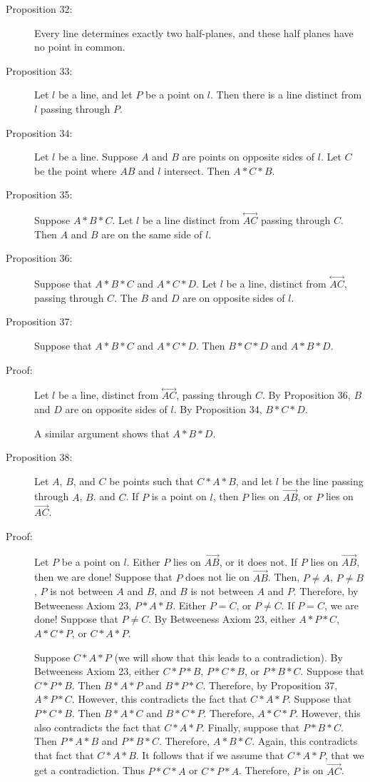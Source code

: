 \documentclass{article}
\newcommand{\linethrough}[1]{\stackrel{\longleftrightarrow}{#1} }
\newcommand{\ray}[1]{\stackrel{\longrightarrow}{#1} }
\begin{document}
\begin{description}

\item[Proposition 32:] Every line determines exactly two half-planes, and these half planes have no point in common.

\item[Proposition 33:] Let $l$ be a line, and let $P$ be a point on $l$. Then there is a line distinct from $l$ passing through $P$.

\item[Proposition 34:] Let $l$ be a line. Suppose $A$ and $B$ are points on opposite sides of $l$. Let $C$ be the point where $AB$ and $l$ intersect. Then $A*C*B$.

\item[Proposition 35:] Suppose $A*B*C$. Let $l$ be a line distinct from $\linethrough{AC}$ passing through $C$. Then $A$ and $B$ are on the same side of $l$.

\item[Proposition 36:] Suppose that $A*B*C$ and $A*C*D$. Let $l$ be a line, distinct from $\linethrough{AC}$, passing through $C$. The $B$ and $D$ are on opposite sides of $l$.

\item[Proposition 37:] Suppose that $A*B*C$ and $A*C*D$. Then $B*C*D$ and $A*B*D$.

\item[Proof:] Let $l$ be a line, distinct from $\linethrough{AC}$, passing through $C$. By Proposition 36, $B$ and $D$ are on opposite sides of $l$. By Proposition 34, $B*C*D$.

  A similar argument shows that $A*B*D$.

\item[Proposition 38:] Let $A$, $B$, and $C$ be points such that $C*A*B$, and let $l$ be the line passing through $A$, $B$. and $C$. If $P$ is a point on $l$, then $P$ lies on $\ray{AB}$, or $P$ lies on $\ray{AC}$.

\item[Proof:] Let $P$ be a point on $l$. Either $P$ lies on $\ray{AB}$, or it does not. If $P$ lies on $\ray{AB}$, then we are done! Suppose that $P$ does not lie on $\ray{AB}$. Then, $P \neq A$, $P \neq B$, $P$ is not between $A$ and $B$, and $B$ is not between $A$ and $P$. Therefore, by Betweeness Axiom 23, $P*A*B$. Either $P=C$, or $P \neq C$. If $P=C$, we are done! Suppose that $P \neq C$. By Betweeness Axiom 23, either $A*P*C$, $A*C*P$, or $C*A*P$.

  Suppose $C*A*P$ (we will show that this leads to a contradiction). By Betweeness Axiom 23, either $C*P*B$, $P*C*B$, or $P*B*C$. Suppose that $C*P*B$. Then $B*A*P$ and $B*P*C$. Therefore, by Proposition 37, $A*P*C$. However, this contradicts the fact that $C*A*P$. Suppose that $P*C*B$. Then $B*A*C$ and $B*C*P$. Therefore, $A*C*P$. However, this also contradicts the fact that $C*A*P$. Finally, suppose that $P*B*C$. Then $P*A*B$ and $P*B*C$. Therefore, $A*B*C$. Again, this contradicts that fact that $C*A*B$. It follows that if we assume that $C*A*P$, that we get a contradiction. Thus $P*C*A$ or $C*P*A$. Therefore, $P$ is on $\ray{AC}$.


\end{description}
\end{document}
